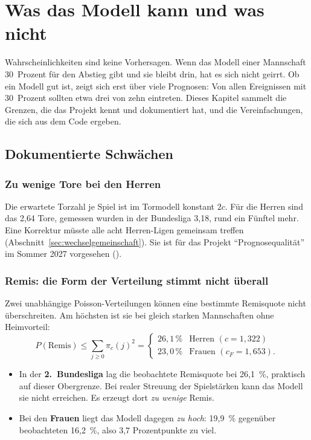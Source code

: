 \chapter{Was das Modell kann und was nicht}\label{kap:grenzen}

Wahrscheinlichkeiten sind keine Vorhersagen. Wenn das Modell einer Mannschaft
30~Prozent für den Abstieg gibt und sie bleibt drin, hat es sich nicht
geirrt. Ob ein Modell gut ist, zeigt sich erst über viele Prognosen: Von
allen Ereignissen mit 30~Prozent sollten etwa drei von zehn eintreten. Dieses
Kapitel sammelt die Grenzen, die das Projekt kennt und dokumentiert hat, und
die Vereinfachungen, die sich aus dem Code ergeben.

\section{Dokumentierte Schwächen}

\subsection{Zu wenige Tore bei den Herren}

Die erwartete Torzahl je Spiel ist im Tormodell konstant $2c$. Für die
Herren sind das 2{,}64 Tore, gemessen wurden in der Bundesliga 3{,}18, rund
ein Fünftel mehr. Eine Korrektur müsste alle acht Herren-Ligen gemeinsam
treffen (Abschnitt~\ref{sec:wechselgemeinschaft}). Sie ist für das Projekt
\enquote{Prognosequalität} im Sommer 2027 vorgesehen
().

\subsection{Remis: die Form der Verteilung stimmt nicht überall}\label{sec:remis}

Zwei unabhängige Poisson-Verteilungen können eine bestimmte Remisquote nicht
überschreiten. Am höchsten ist sie bei gleich starken Mannschaften ohne
Heimvorteil:
\begin{equation}
  P(\text{Remis}) \le \sum_{j \ge 0} \pi_c(j)^2 =
  \begin{cases} 26{,}1\,\% & \text{Herren } (c = 1{,}322)\\ 23{,}0\,\% & \text{Frauen } (c_F = 1{,}653).\end{cases}
\end{equation}

\begin{itemize}
  \item In der \textbf{2.~Bundesliga} lag die beobachtete Remisquote bei
        26{,}1~\%, praktisch auf dieser Obergrenze. Bei realer Streuung der
        Spielstärken kann das Modell sie nicht erreichen. Es erzeugt dort
        \emph{zu wenige} Remis.
  \item Bei den \textbf{Frauen} liegt das Modell dagegen \emph{zu hoch}:
        19{,}9~\% gegenüber beobachteten 16{,}2~\%, also 3{,}7 Prozentpunkte
        zu viel.
\end{itemize}

